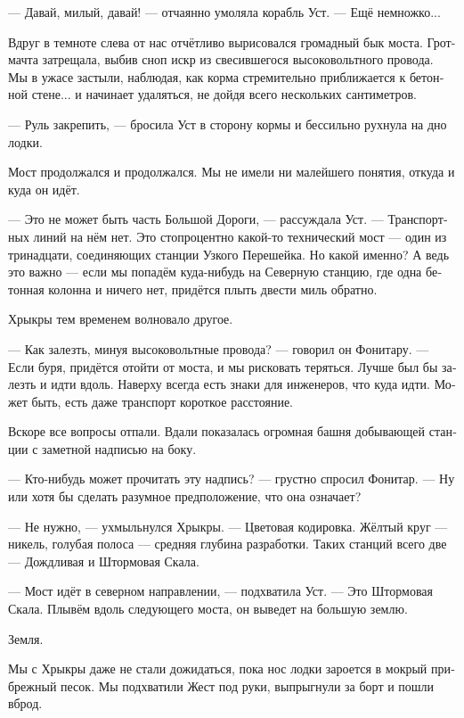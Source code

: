 \documentclass[a4paper,12pt,fleqn]{book}\usepackage{polyglossia}\setdefaultlanguage[babelshorthands=true]{russian}\setotherlanguage{english}\defaultfontfeatures{Ligatures=TeX,Mapping=tex-text}
\newcommand{\asterism}{\vspace{1em}{\centering\Large\bfseries$\ast~\ast~\ast$\par}\vspace{1em}}
\begin{document}
--- Давай, милый, давай! --- отчаянно умоляла корабль Уст.
--- Ещё немножко...

Вдруг в темноте слева от нас отчётливо вырисовался громадный бык моста.
Грот-мачта затрещала, выбив сноп искр из свесившегося высоковольтного провода.
Мы в ужасе застыли, наблюдая, как корма стремительно приближается к бетонной стене... и начинает удаляться, не дойдя всего нескольких сантиметров.

--- Руль закрепить, --- бросила Уст в сторону кормы и бессильно рухнула на дно лодки.

\asterism

Мост продолжался и продолжался.
Мы не имели ни малейшего понятия, откуда и куда он идёт.

--- Это не может быть часть Большой Дороги, --- рассуждала Уст.
--- Транспортных линий на нём нет.
Это стопроцентно какой-то технический мост --- один из тринадцати, соединяющих станции Узкого Перешейка.
Но какой именно?
А ведь это важно --- если мы попадём куда-нибудь на Северную станцию, где одна бетонная колонна и ничего нет, придётся плыть двести миль обратно.

Хрыкры тем временем волновало другое.

--- Как залезть, минуя высоковольтные провода? --- говорил он Фонитару.
--- Если буря, придётся отойти от моста, и мы рисковать теряться.
Лучше был бы залезть и идти вдоль.
Наверху всегда есть знаки для инженеров, что куда идти.
Может быть, есть даже транспорт короткое расстояние.

Вскоре все вопросы отпали.
Вдали показалась огромная башня добывающей станции с заметной надписью на боку.

--- Кто-нибудь может прочитать эту надпись? --- грустно спросил Фонитар.
--- Ну или хотя бы сделать разумное предположение, что она означает?

--- Не нужно, --- ухмыльнулся Хрыкры.
--- Цветовая кодировка.
Жёлтый круг --- никель, голубая полоса --- средняя глубина разработки.
Таких станций всего две --- Дождливая и Штормовая Скала.

--- Мост идёт в северном направлении, --- подхватила Уст.
--- Это Штормовая Скала.
Плывём вдоль следующего моста, он выведет на большую землю.

\asterism

Земля.

Мы с Хрыкры даже не стали дожидаться, пока нос лодки зароется в мокрый прибрежный песок.
Мы подхватили Жест под руки, выпрыгнули за борт и пошли вброд.
\end{document}
